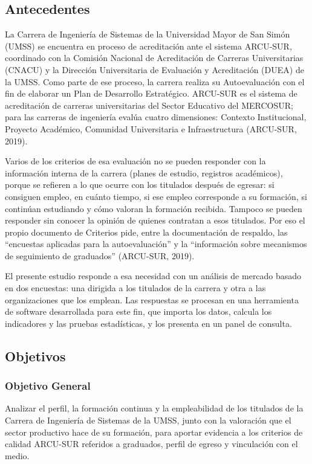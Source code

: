 \documentclass[12pt, a4paper]{article}
\begin{document}
\subsection{Antecedentes}

La Carrera de Ingeniería de Sistemas de la Universidad Mayor de San Simón
(UMSS) se encuentra en proceso de acreditación ante el sistema ARCU-SUR,
coordinado con la Comisión Nacional de Acreditación de Carreras
Universitarias (CNACU) y la Dirección Universitaria de Evaluación y
Acreditación (DUEA) de la UMSS. Como parte de ese proceso, la carrera
realiza su Autoevaluación con el fin de elaborar un Plan de Desarrollo
Estratégico. ARCU-SUR es el sistema de acreditación de carreras
universitarias del Sector Educativo del MERCOSUR; para las carreras de
ingeniería evalúa cuatro dimensiones: Contexto Institucional, Proyecto
Académico, Comunidad Universitaria e Infraestructura (ARCU-SUR, 2019).

Varios de los criterios de esa evaluación no se pueden responder con la
información interna de la carrera (planes de estudio, registros
académicos), porque se refieren a lo que ocurre con los titulados
después de egresar: si consiguen empleo, en cuánto tiempo, si ese empleo
corresponde a su formación, si continúan estudiando y cómo valoran la
formación recibida. Tampoco se pueden responder sin conocer la opinión de
quienes contratan a esos titulados. Por eso el propio documento de
Criterios pide, entre la documentación de respaldo, las ``encuestas
aplicadas para la autoevaluación'' y la ``información sobre mecanismos
de seguimiento de graduados'' (ARCU-SUR, 2019).

El presente estudio responde a esa necesidad con un análisis de mercado
basado en dos encuestas: una dirigida a los titulados de la carrera y
otra a las organizaciones que los emplean. Las respuestas se procesan en
una herramienta de software desarrollada para este fin, que importa los
datos, calcula los indicadores y las pruebas estadísticas, y los presenta
en un panel de consulta.

\subsection{Objetivos}

\subsubsection{Objetivo General}

Analizar el perfil, la formación continua y la empleabilidad de los
titulados de la Carrera de Ingeniería de Sistemas de la UMSS, junto con
la valoración que el sector productivo hace de su formación, para
aportar evidencia a los criterios de calidad ARCU-SUR referidos a
graduados, perfil de egreso y vinculación con el medio.
\end{document}
